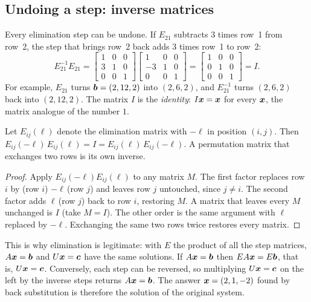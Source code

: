 \subsection{Undoing a step: inverse matrices}

Every elimination step can be undone. If $E_{21}$ subtracts $3$ times row~1 from row~2, the
step that brings row~2 back adds $3$ times row~1 to row~2:
\[
  E_{21}^{-1}E_{21}=
  \begin{bmatrix} 1 & 0 & 0\\ 3 & 1 & 0\\ 0 & 0 & 1\end{bmatrix}
  \begin{bmatrix} 1 & 0 & 0\\ -3 & 1 & 0\\ 0 & 0 & 1\end{bmatrix}
  =\begin{bmatrix} 1 & 0 & 0\\ 0 & 1 & 0\\ 0 & 0 & 1\end{bmatrix}=I .
\]
For example, $E_{21}$ turns $\boldsymbol{b}=(2,12,2)$ into $(2,6,2)$, and $E_{21}^{-1}$ turns
$(2,6,2)$ back into $(2,12,2)$. The matrix $I$ is the \emph{identity}: $I\boldsymbol{x}=\boldsymbol{x}$ for
every $\boldsymbol{x}$, the matrix analogue of the number $1$.

\begin{proposition}\label{prop:u03-Einv}
Let $E_{ij}(\ell)$ denote the elimination matrix with $-\ell$ in position $(i,j)$. Then
$E_{ij}(-\ell)\,E_{ij}(\ell)=I=E_{ij}(\ell)\,E_{ij}(-\ell)$. A permutation matrix that
exchanges two rows is its own inverse.
\end{proposition}

\begin{proof}
Apply $E_{ij}(-\ell)E_{ij}(\ell)$ to any matrix $M$. The first factor replaces row $i$ by
(row $i$) $-\ell\,$(row $j$) and leaves row $j$ untouched, since $j\neq i$. The second factor
adds $\ell\,$(row $j$) back to row $i$, restoring $M$. A matrix that leaves every $M$
unchanged is $I$ (take $M=I$). The other order is the same argument with $\ell$ replaced by
$-\ell$. Exchanging the same two rows twice restores every matrix.
\end{proof}

This is why elimination is legitimate: with $E$ the product of all the step matrices,
$A\boldsymbol{x}=\boldsymbol{b}$ and $U\boldsymbol{x}=\boldsymbol{c}$ have the same solutions. If $A\boldsymbol{x}=\boldsymbol{b}$ then
$EA\boldsymbol{x}=E\boldsymbol{b}$, that is, $U\boldsymbol{x}=\boldsymbol{c}$. Conversely, each step can be reversed, so
multiplying $U\boldsymbol{x}=\boldsymbol{c}$ on the left by the inverse steps returns $A\boldsymbol{x}=\boldsymbol{b}$. The
answer $\boldsymbol{x}=(2,1,-2)$ found by back substitution is therefore the solution of the original
system.

